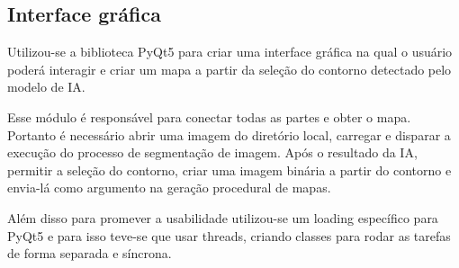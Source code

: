 \subsection{Interface gráfica}

Utilizou-se a biblioteca PyQt5 para criar uma interface gráfica na qual o usuário poderá interagir e criar um mapa a partir da seleção do contorno detectado pelo modelo de IA.

Esse módulo é responsável para conectar todas as partes e obter o mapa. Portanto é necessário abrir uma imagem do diretório local, carregar e disparar a execução do processo de segmentação de imagem. Após o resultado da IA, permitir a seleção do contorno,  criar uma imagem binária a partir do contorno e envia-lá como argumento na geração procedural de mapas.

Além disso para promever a usabilidade utilizou-se um loading específico para PyQt5 e para isso teve-se que usar threads, criando classes para rodar as tarefas de forma separada e síncrona.